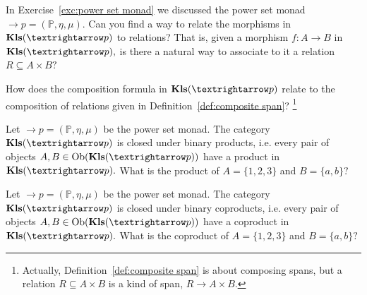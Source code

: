 \documentclass[../main/CT4S-EN-RU]{subfiles}
\begin{document}
\begin{exampleRUS}\label{ex:experimenter matters 3}
\end{exampleRUS}

\begin{exerciseENG}\label{exc:kleisli powerset relations}
In Exercise~\ref{exc:power set monad} we discussed the power set monad ${→}p=({ℙ},\eta,\mu).$
\sexc Can you find a way to relate the morphisms in $\Kls({→}p)$ to relations? That is, given a morphism $f\colon A{→} B$ in $\Kls({→}p),$ is there a natural way to associate to it a relation $R\subseteq A\times B?$
\item How does the composition formula in $\Kls({→}p)$ relate to the composition of relations given in Definition~\ref{def:composite span}?
\footnote{Actually, Definition~\ref{def:composite span} is about composing spans, but a relation $R\subseteq A\times B$ is a kind of span, $R{→} A\times B.$}
\endsexc
\end{exerciseENG}

\begin{exerciseRUS}\label{exc:kleisli powerset relations}
\end{exerciseRUS}

\begin{exerciseENG}
Let ${→}p=({ℙ},\eta,\mu)$ be the power set monad. The category $\Kls({→}p)$ is closed under binary products, i.e. every pair of objects $A,B\in\Ob(\Kls({→}p))$ have a product in $\Kls({→}p).$ What is the product of $A=\{1,2,3\}$ and $B=\{a,b\}?$
\end{exerciseENG}

\begin{exerciseRUS}
\end{exerciseRUS}

\begin{exerciseENG}
Let ${→}p=({ℙ},\eta,\mu)$ be the power set monad. The category $\Kls({→}p)$ is closed under binary coproducts, i.e. every pair of objects $A,B\in\Ob(\Kls({→}p))$ have a coproduct in $\Kls({→}p).$ What is the coproduct of $A=\{1,2,3\}$ and $B=\{a,b\}?$
\end{exerciseENG}

\begin{exerciseRUS}
\end{exerciseRUS}
\end{document}
